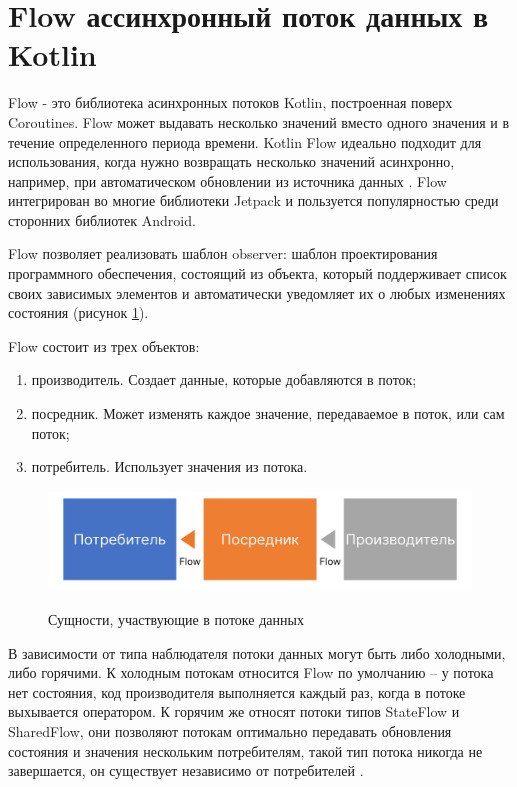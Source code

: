 \section{Flow ассинхронный поток данных в Kotlin}

Flow - это библиотека асинхронных потоков Kotlin, построенная поверх Coroutines. Flow может выдавать несколько значений вместо одного значения и в течение определенного периода времени. Kotlin Flow идеально подходит для использования, когда нужно возвращать несколько значений асинхронно, например, при автоматическом обновлении из источника данных \cite{book:flow}. Flow интегрирован во многие библиотеки Jetpack и пользуется популярностью среди сторонних библиотек Android. 

Flow позволяет реализовать шаблон observer: шаблон проектирования программного обеспечения, состоящий из объекта, который поддерживает список своих зависимых элементов и автоматически уведомляет их о любых изменениях состояния (рисунок \ref{fig:flow}). 

Flow состоит из трех объектов:
\begin{enumerate}
    \item производитель. Создает данные, которые добавляются в поток;
    \item посредник. Может изменять каждое значение, передаваемое в поток, или сам поток;
    \item потребитель. Использует значения из потока.
\end{enumerate}

\begin{figure}[h!]
    \begin{center}
        \includegraphics[width=0.95\hsize]{fig/flow.png}\\[2mm]
        \caption{Сущности, участвующие в потоке данных}\label{fig:flow}
    \end{center}
\end{figure}

В зависимости от типа наблюдателя потоки данных могут быть либо холодными, либо горячими. К холодным потокам относится Flow по умолчанию -- у потока нет состояния, код производителя выполняется каждый раз, когда в потоке выхывается оператором. К горячим же относят потоки типов StateFlow и SharedFlow, они позволяют потокам оптимально передавать обновления состояния и значения нескольким потребителям, такой тип потока никогда не завершается, он существует независимо от потребителей \cite{book:shrdflow}.


